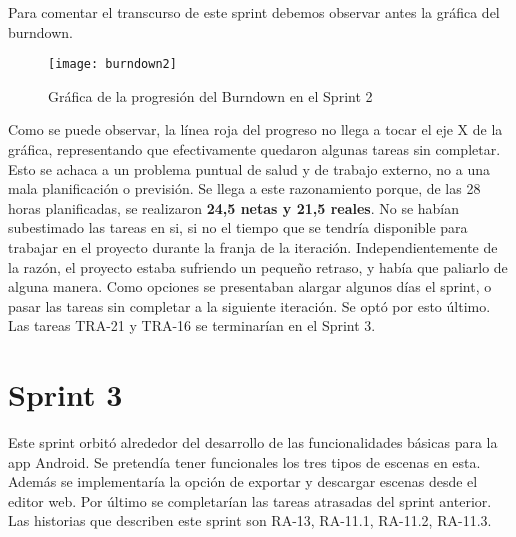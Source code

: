 \begin{table}[H]
\label{TRA-22}
\end{table}

Para comentar el transcurso de este sprint debemos observar antes la gráfica del burndown.

\begin{figure}[h]
    \centering
    \texttt{[image: burndown2]}
    \caption[Burndown Sprint 2]{Gráfica de la progresión del Burndown en el Sprint 2}
\end{figure}

Como se puede observar, la línea roja del progreso no llega a tocar el eje X de la gráfica, representando que efectivamente quedaron algunas tareas sin completar. Esto se achaca a un problema puntual de salud y de trabajo externo, no a una mala planificación o previsión. Se llega a este razonamiento porque, de las 28 horas planificadas, se realizaron \textbf{24,5 netas y 21,5 reales}. No se habían subestimado las tareas en si, si no el tiempo que se tendría disponible para trabajar en el proyecto durante la franja de la iteración. Independientemente de la razón, el proyecto estaba sufriendo un pequeño retraso, y había que paliarlo de alguna manera. Como opciones se presentaban alargar algunos días el sprint, o pasar las tareas sin completar a la siguiente iteración. Se optó por esto último. Las tareas TRA-21 y TRA-16 se terminarían en el Sprint 3.

\section{Sprint 3}

Este sprint orbitó alrededor del desarrollo de las funcionalidades básicas para la app Android. Se pretendía tener funcionales los tres tipos de escenas en esta. Además se implementaría la opción de exportar y descargar escenas desde el editor web. Por último se completarían las tareas atrasadas del sprint anterior. Las historias que describen este sprint son  RA-13, RA-11.1, RA-11.2, RA-11.3.

